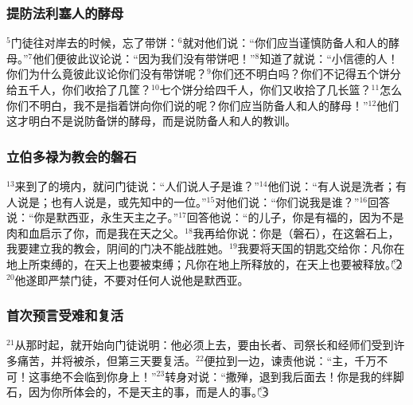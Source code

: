 \subsubsection{提防法利塞人的酵母}
$^{5}$门徒往对岸去的时候，忘了带饼：$^{6}$\UL[耶稣]就对他们说：“你们应当谨慎防备\UL[法利塞]人和\UL[撒杜塞]人的酵母。”$^{7}$他们便彼此议论说：“因为我们没有带饼吧！”$^{8}$\UL[耶稣]知道了就说：“小信德的人！你们为什么竟彼此议论你们没有带饼呢？$^{9}$你们还不明白吗？你们不记得五个饼分给五千人，你们收拾了几筐？$^{10}$七个饼分给四千人，你们又收拾了几长篮？$^{11}$怎么你们不明白，我不是指着饼向你们说的呢？你们应当防备\UL[法利塞]人和\UL[撒杜塞]人的酵母！”$^{12}$他们这才明白\UL[耶稣]不是说防备饼的酵母，而是说防备\UL[法利塞]人和\UL[撒杜塞]人的教训。


\subsubsection{立伯多禄为教会的磐石}
$^{13}$\UL[耶稣]来到了\UL[斐理伯]的\UL[凯撒勒雅]境内，就问门徒说：“人们说人子是谁？”$^{14}$他们说：“有人说是洗者\UL[若翰]；有人说是\UL[厄里亚]；也有人说是\UL[耶肋米亚]，或先知中的一位。”$^{15}$\UL[耶稣]对他们说：“你们说我是谁？”$^{16}$\UL[西满]\UL[伯多禄]回答说：“你是默西亚，永生天主之子。”$^{17}$\UL[耶稣]回答他说：“\UL[约纳]的儿子\UL[西满]，你是有福的，因为不是肉和血启示了你，而是我在天之父。$^{18}$我再给你说：你是\UL[伯多禄]（磐石），在这磐石上，我要建立我的教会，阴间的门决不能战胜她。$^{19}$我要将天国的钥匙交给你：凡你在地上所束缚的，在天上也要被束缚；凡你在地上所释放的，在天上也要被释放。”\textcircled{2}$^{20}$他遂即严禁门徒，不要对任何人说他是默西亚。


\subsubsection{首次预言受难和复活}
$^{21}$从那时起，\UL[耶稣]就开始向门徒说明：他必须上\UL[耶路撒冷]去，要由长者、司祭长和经师们受到许多痛苦，并将被杀，但第三天要复活。$^{22}$\UL[伯多禄]便拉\UL[耶稣]到一边，谏责他说：“主，千万不可！这事绝不会临到你身上！”$^{23}$\UL[耶稣]转身对\UL[伯多禄]说：“撒殚，退到我后面去！你是我的绊脚石，因为你所体会的，不是天主的事，而是人的事。”\textcircled{3}


